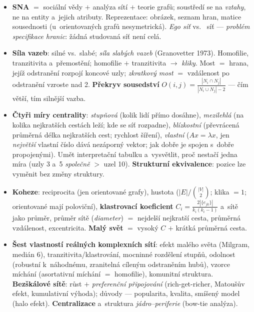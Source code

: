 \documentclass[11pt,a4paper]{article}
\theoremstyle{definition}
\begin{document}
\begin{itemize}
\item \textbf{SNA} $=$ sociální vědy $+$ analýza sítí $+$ teorie grafů; soustředí se na
      \emph{vztahy}, ne na entity a~jejich atributy. Reprezentace: obrázek, seznam hran, matice
      sousednosti (u~orientovaných grafů nesymetrická). \emph{Ego síť} vs.\  síť ---
      \emph{problém specifikace hranic}: žádná studovaná síť není celá.
\item \textbf{Síla vazeb}: silné vs.\ slabé; \emph{síla slabých vazeb} (Granovetter 1973).
      Homofilie, tranzitivita a~přemostění; homofilie $+$ tranzitivita $\to$ \emph{kliky}.
      Most $=$ hrana, jejíž odstranění rozpojí koncové uzly; \emph{zkratkový most} $=$
      vzdálenost po odstranění vzroste nad 2. \textbf{Překryv sousedství}
      $O(i,j)=\frac{|N_i\cap N_j|}{|N_i\cup N_j|-2}$ --- čím větší, tím silnější vazba.
\item \textbf{Čtyři míry centrality}: \emph{stupňová} (kolik lidí přímo dosáhne),
      \emph{mezilehlá} (na kolika nejkratších cestách leží; kde se síť rozpadne),
      \emph{blízkostní} (převrácená průměrná délka nejkratších cest; rychlost šíření),
      \emph{vlastní} ($Ax=\lambda x$, jen \emph{největší} vlastní číslo dává nezáporný vektor;
      jak dobře je spojen s~dobře propojenými). Umět interpretační tabulku a~vysvětlit, proč
      nestačí jedna míra (uzly 3 a~5 \emph{společně} $>$ uzel 10). \textbf{Strukturní
      ekvivalence}: pozice lze vyměnit bez změny struktury.
\item \textbf{Koheze}: reciprocita (jen orientované grafy), hustota
      ($|E|/\binom{|V|}{2}$; klika $=1$; orientované mají poloviční), \textbf{klastrovací
      koeficient} $C_i=\frac{2|\{e_{jk}\}|}{k_i(k_i-1)}$ a~sítě jako průměr, průměr sítě
      (\emph{diameter}) $=$ nejdelší nejkratší cesta, průměrná vzdálenost, excentricita.
      \textbf{Malý svět} $=$ vysoký $C$ $+$ krátká průměrná cesta.
\item \textbf{Šest vlastností reálných komplexních sítí}: efekt malého světa (Milgram, medián
      6), tranzitivita/klastrování, mocninné rozdělení stupňů, odolnost (robustní k~náhodnému,
      zranitelná cíleným odstraněním hubů), vzorce míchání (asortativní míchání $=$ homofilie),
      komunitní struktura. \textbf{Bezškálové sítě}: růst $+$ \emph{preferenční připojování}
      (rich-get-richer, Matoušův efekt, kumulativní výhoda); důvody --- popularita, kvalita,
      smíšený model (halo efekt). \textbf{Centralizace} a~struktura \emph{jádro--periferie}
      (bow-tie analýza).

\end{itemize}
\end{document}
